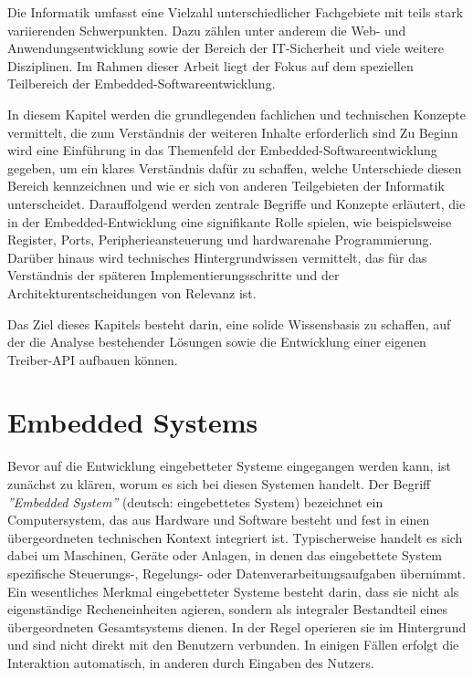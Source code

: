 
Die Informatik umfasst eine Vielzahl unterschiedlicher Fachgebiete mit teils stark variierenden Schwerpunkten. 
Dazu zählen unter anderem die Web- und Anwendungsentwicklung sowie der Bereich der IT-Sicherheit und viele weitere Disziplinen. 
Im Rahmen dieser Arbeit liegt der Fokus auf dem speziellen Teilbereich der Embedded-Softwareentwicklung.

In diesem Kapitel werden die grundlegenden fachlichen und technischen Konzepte vermittelt, die zum Verständnis der weiteren Inhalte erforderlich sind
Zu Beginn wird eine Einführung in das Themenfeld der Embedded-Softwareentwicklung gegeben, um ein klares Verständnis dafür zu schaffen, welche Unterschiede diesen Bereich kennzeichnen und wie er sich von anderen Teilgebieten der Informatik unterscheidet.
Darauffolgend werden zentrale Begriffe und Konzepte erläutert, die in der Embedded-Entwicklung eine signifikante Rolle spielen, wie beispielsweise Register, Ports, Peripherieansteuerung und hardwarenahe Programmierung.
Darüber hinaus wird technisches Hintergrundwissen vermittelt, das für das Verständnis der späteren Implementierungsschritte und der Architekturentscheidungen von Relevanz ist.

Das Ziel dieses Kapitels besteht darin, eine solide Wissensbasis zu schaffen, auf der die Analyse bestehender Lösungen sowie die Entwicklung einer eigenen Treiber-API aufbauen können.

\section{Embedded Systems}
Bevor auf die Entwicklung eingebetteter Systeme eingegangen werden kann, ist zunächst zu klären, worum es sich bei diesen Systemen handelt.
Der Begriff \emph{''Embedded System''} (deutsch: eingebettetes System) bezeichnet ein Computersystem, das aus Hardware und Software besteht und fest in einen übergeordneten technischen Kontext integriert ist. 
Typischerweise handelt es sich dabei um Maschinen, Geräte oder Anlagen, in denen das eingebettete System spezifische Steuerungs-, Regelungs- oder Datenverarbeitungsaufgaben übernimmt.
Ein wesentliches Merkmal eingebetteter Systeme besteht darin, dass sie nicht als eigenständige Recheneinheiten agieren, sondern als integraler Bestandteil eines übergeordneten Gesamtsystems dienen.
In der Regel operieren sie im Hintergrund und sind nicht direkt mit den Benutzern verbunden. In einigen Fällen erfolgt die Interaktion automatisch, in anderen durch Eingaben des Nutzers.


